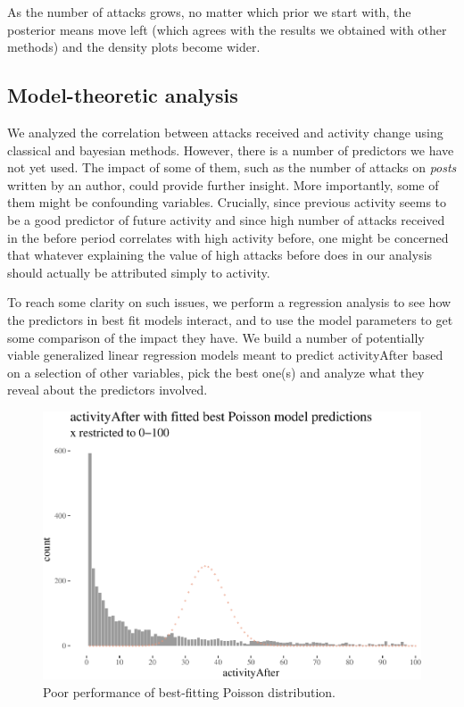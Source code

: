 \documentclass[a4paper,fleqn]{cas-dc}
\begin{document}
As the number of attacks grows, no matter which prior we start with, the
posterior means move left (which agrees with the results we obtained
with other methods) and the density plots become wider.



\subsection{Model-theoretic analysis}

\normalsize

We analyzed the correlation between attacks received and activity change
using classical and bayesian methods. However, there is a number of
predictors we have not yet used. The impact of some of them, such as the
number of attacks on \emph{posts} written by an author, could provide
further insight. More importantly, some of them might be confounding
variables. Crucially, since previous activity seems to be a good
predictor of future activity and since high number of attacks received
in the \textsf{before} period correlates with high activity before, one
might be concerned that whatever explaining the value of high attacks
before does in our analysis should actually be attributed simply to
activity.

To reach some clarity on such issues, we perform a regression analysis
to see how the predictors in best fit models interact, and to use the
model parameters to get some comparison of the impact they have. We
build a number of potentially viable generalized linear regression
models meant to predict \textsf{activityAfter} based on a selection of
other variables, pick the best one(s) and analyze what they reveal about
the predictors involved.

\footnotesize

\normalsize 

\begin{figure}
\begin{center}
\includegraphics[width=1\linewidth]{images/unnamed-chunk-31-1} \end{center}
\caption{Poor performance of best-fitting Poisson distribution.}
\label{fig:poissBad}
\end{figure}
\end{document}
